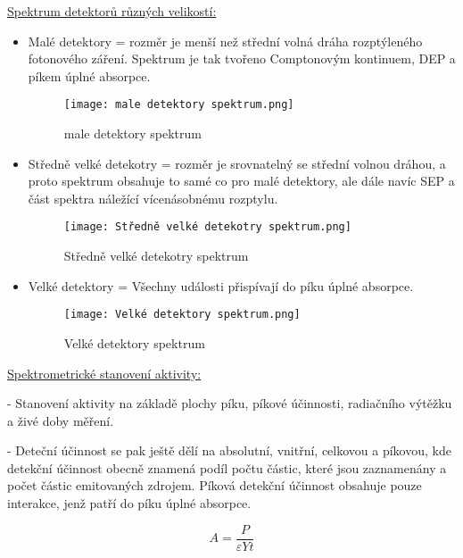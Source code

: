 \underline{Spektrum detektorů různých velikostí:}
\begin{itemize}
    \item Malé detektory = rozměr je menší než střední volná dráha rozptýleného fotonového záření. Spektrum je tak tvořeno Comptonovým kontinuem, DEP a píkem úplné absorpce.

\begin{figure}[ht!]
    \centering
    \texttt{[image: male detektory spektrum.png]}
    \caption{male detektory spektrum}
\end{figure}
    
    \item Středně velké detekotry = rozměr je srovnatelný se střední volnou dráhou, a proto spektrum obsahuje to samé co pro malé detektory, ale dále navíc SEP a část spektra náležící vícenásobnému rozptylu.

\begin{figure}[ht!]
    \centering
    \texttt{[image: Středně velké detekotry spektrum.png]}
    \caption{Středně velké detekotry spektrum}
\end{figure}
    
    \item Velké detektory = Všechny události přispívají do píku úplné absorpce.

\begin{figure}[ht!]
    \centering
    \texttt{[image: Velké detektory spektrum.png]}
    \caption{Velké detektory spektrum}
\end{figure}
    
\end{itemize}

\underline{Spektrometrické stanovení aktivity:}

- Stanovení aktivity na základě plochy píku, píkové účinnosti, radiačního výtěžku a živé doby měření. 

- Deteční účinnost se pak ještě dělí na absolutní, vnitřní, celkovou a píkovou, kde detekční účinnost obecně znamená podíl počtu částic, které jsou zaznamenány a počet částic emitovaných zdrojem. Píková detekční účinnost obsahuje pouze interakce, jenž patří do píku úplné absorpce.

\begin{center}
    \begin{equation}
        A = \frac{P}{\varepsilon Y t}
    \end{equation}
\end{center}
















